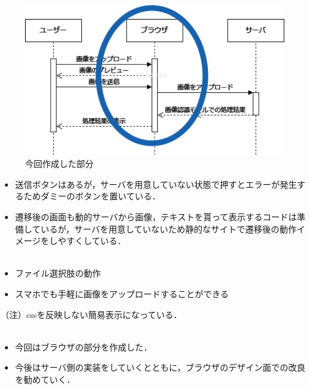 \begin{figure}
	\centering
	\includegraphics[width=0.6\linewidth]{fig/tamura/gaiyou_point}
	\caption{今回作成した部分}
	\label{fig:gaiyoupoint}
\end{figure}


\begin{itemize}
	\item 送信ボタンはあるが，サーバを用意していない状態で押すとエラーが発生するためダミーのボタンを置いている．
	\item 遷移後の画面も動的サーバから画像，テキストを貰って表示するコードは準備しているが，サーバを用意していないため静的なサイトで遷移後の動作イメージをしやすくしている．\\
		\href{run:./fig/tamura/web_demo.mp4}{\textcolor[hsb]{0.0, 0.7, 1.0}{\faPlayCircle[regular]}}\\
\end{itemize}




\begin{itemize}
	\item 	ファイル選択肢の動作
	\item スマホでも手軽に画像をアップロードすることができる
\end{itemize}
	（注）cssを反映しない簡易表示になっている．\\
		\href{run:./fig/tamura/Phone_demo.mp4}{\textcolor[hsb]{0.0, 0.7, 1.0}{\faPlayCircle[regular]}}\\

\newpage
\begin{itemize}
	\item 今回はブラウザの部分を作成した．
	\item 今後はサーバ側の実装をしていくとともに，ブラウザのデザイン面での改良を勧めていく．
\end{itemize}


